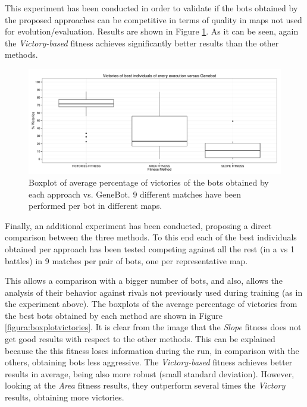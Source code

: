 \documentclass[preprint]{elsarticle}
\begin{document}
This experiment has been conducted in order to validate if the bots obtained by the proposed approaches can be competitive in terms of quality in maps not used for evolution/evaluation. Results are shown in Figure \ref{figura:boxplotvictoriesgenebot}. As it can be seen, again the \textit{Victory-based} fitness achieves significantly better results than the other methods.


\begin{figure}[ht]
 \begin{center}
   \includegraphics[width=12cm]{nuevas_imgs/vsGENEBOT_Boxplot.pdf}
 \end{center}
 \caption{Boxplot of average percentage of victories of the bots obtained by each approach vs. GeneBot. 9 different matches have been performed per bot in different maps.} 
 \label{figura:boxplotvictoriesgenebot}
 \end{figure}

Finally, an additional experiment has been conducted, proposing a direct comparison between the three methods. To this end each of the best individuals obtained per approach has been tested competing against all the rest (in a vs 1 battles) in 9 matches per pair of bots, one per representative map.

This allows a comparison with a bigger number of bots, and also,
allows the analysis of their behavior against rivals not previously
used during training (as in the experiment above). 
The boxplots of the average percentage of victories from the best bots obtained by each method are shown in Figure \ref{figura:boxplotvictories}. It is clear from the image that the \textit{Slope} fitness does not get good results with respect to the other methods. This can be explained because the this fitness loses information during the run, in comparison with the others, obtaining bots less aggressive. 
The \textit{Victory-based} fitness achieves better results in average, being also more robust (small standard deviation). However, looking at the \textit{Area} fitness results, they outperform several times the \textit{Victory} results, obtaining more victories.
\end{document}
